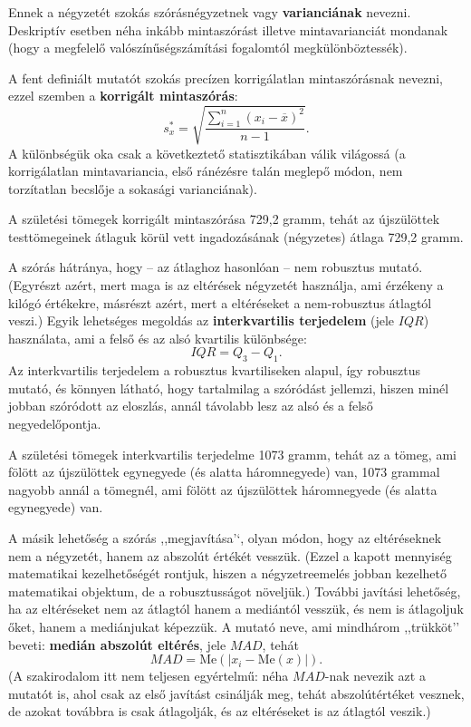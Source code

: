 \documentclass[]{book}
\begin{document}
Ennek a négyzetét szokás szórásnégyzetnek vagy \textbf{varianciának}
nevezni. Deskriptív esetben néha inkább mintaszórást illetve
mintavarianciát mondanak (hogy a megfelelő valószínűségszámítási
fogalomtól megkülönböztessék).

A fent definiált mutatót szokás precízen korrigálatlan mintaszórásnak
nevezni, ezzel szemben a \textbf{korrigált mintaszórás}: \[
    s_x^{\ast}=\sqrt{\frac{\sum_{i=1}^n \left(x_i-\overline{x}\right)^2}{n-1}}.
\] A különbségük oka csak a következtető statisztikában válik világossá
(a korrigálatlan mintavariancia, első ránézésre talán meglepő módon, nem
torzítatlan becslője a sokasági varianciának).

A születési tömegek korrigált mintaszórása 729,2 gramm, tehát az
újszülöttek testtömegeinek átlaguk körül vett ingadozásának (négyzetes)
átlaga 729,2 gramm.

A szórás hátránya, hogy -- az átlaghoz hasonlóan -- nem robusztus
mutató. (Egyrészt azért, mert maga is az eltérések négyzetét használja,
ami érzékeny a kilógó értékekre, másrészt azért, mert a eltéréseket a
nem-robusztus átlagtól veszi.) Egyik lehetséges megoldás az
\textbf{interkvartilis terjedelem} (jele \(IQR\)) használata, ami a
felső és az alsó kvartilis különbsége: \[
    IQR=Q_3-Q_1.
\] Az interkvartilis terjedelem a robusztus kvartiliseken alapul, így
robusztus mutató, és könnyen látható, hogy tartalmilag a szóródást
jellemzi, hiszen minél jobban szóródott az eloszlás, annál távolabb lesz
az alsó és a felső negyedelőpontja.

A születési tömegek interkvartilis terjedelme 1073 gramm, tehát az a
tömeg, ami fölött az újszülöttek egynegyede (és alatta háromnegyede)
van, 1073 grammal nagyobb annál a tömegnél, ami fölött az újszülöttek
háromnegyede (és alatta egynegyede) van.

A másik lehetőség a szórás ,,megjavítása'`, olyan módon, hogy az
eltéréseknek nem a négyzetét, hanem az abszolút értékét vesszük. (Ezzel
a kapott mennyiség matematikai kezelhetőségét rontjuk, hiszen a
négyzetreemelés jobban kezelhető matematikai objektum, de a
robusztusságot növeljük.) További javítási lehetőség, ha az eltéréseket
nem az átlagtól hanem a mediántól vesszük, és nem is átlagoljuk őket,
hanem a mediánjukat képezzük. A mutató neve, ami mindhárom ,,trükköt''
beveti: \textbf{medián abszolút eltérés}, jele \(MAD\), tehát \[
    MAD=\mathrm{Me}\left(\left|x_i-\mathrm{Me}\left(x\right)\right|\right).
\] (A szakirodalom itt nem teljesen egyértelmű: néha \(MAD\)-nak nevezik
azt a mutatót is, ahol csak az első javítást csinálják meg, tehát
abszolútértéket vesznek, de azokat továbbra is csak átlagolják, és az
eltéréseket is az átlagtól veszik.)
\end{document}
